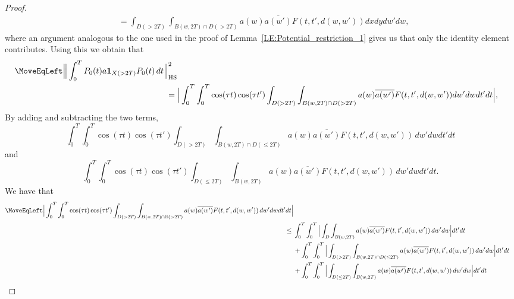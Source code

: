 \documentclass[11pt,twoside,reqno]{amsart}
\newcommand{\bH}{\mathbb{H}}
\newcommand{\1}{\mathrm{\mathbf{1}}}
\newcommand{\bHS}{\mathrm{HS}}
\numberwithin{equation}{section}
\theoremstyle{plain}
\theoremstyle{definition}
\theoremstyle{remark}
\begin{document}
\begin{proof}
\begin{equation*}
\begin{aligned}
         &=\int_{D( > 2T)}  \int_{B(w,2T)\cap D( > 2T) }  a(w) \overline{a(w')}  F(t,t',d(w, w')) dx dyd w' d w, 
    \end{aligned}
\end{equation*}
where an argument analogous to the one used in the proof of Lemma~\ref{LE:Potential_restriction_1} gives us that only the identity element contributes. Using this we obtain that 
\begin{equation}\label{EQ:free_HS_est_exponential_mixing_1}
    \begin{aligned}
         \MoveEqLeft \Big\lVert \int_0^T  P_0(t) a \boldsymbol{1}_{X( > 2T)} P_0(t) \,d t  \Big\rVert_{\bHS}^2 
         \\
         ={}&\Big| \int_0^T\int_0^T \cos(\tau t) \cos(\tau t') \int_{D( > 2T)}  \int_{B(w,2T)\cap D( > 2T) }  a(w) \overline{a(w')}  F(t,t',d(w,w'))d w' d w      d t'd t\Big|,
    \end{aligned}
\end{equation}
By adding and subtracting the two terms, 
\begin{equation*}
     \int_0^T\int_0^T \cos(\tau t) \cos(\tau t') \int_{D( > 2T)}  \int_{B(w,2T)\cap D( \leq 2T) } a(w) \overline{a(w')} F(t,t',d(w,w'))  \,d w' d w      d t'd t
\end{equation*}
and
\begin{equation*}
     \int_0^T\int_0^T \cos(\tau t) \cos(\tau t') \int_{D( \leq 2T)}  \int_{B(w,2T)} a(w) \overline{a(w')}  F(t,t',d(w,w')) \,d w' d w      d t'd t.
\end{equation*}
We have that
\begin{equation}\label{EQ:free_HS_est_exponential_mixing_3}
    \begin{aligned}
         \MoveEqLeft \Big| \int_0^T\int_0^T \cos(\tau t) \cos(\tau t') \int_{D( > 2T)}  \int_{B(w,2T)\cap \bH( > 2T) } a(w) \overline{a(w')} F(t,t',d(w,w'))  \,d w' d w      d t'd t\Big|
         \\
         \leq {}&  \int_0^T\int_0^T \Big| \int_{D}  \int_{B(w,2T) } a(w) \overline{a(w')}  F(t,t',d(w,w')) \,d w' d w   \Big|   d t'd t
         \\
         &+ \int_0^T\int_0^T \Big| \int_{D( > 2T)}  \int_{B(w,2T)\cap D( \leq 2T) } a(w) \overline{a(w')} F(t,t',d(w,w'))  \,d w' d w    \Big|  d t'd t 
         \\
         &+ \int_0^T\int_0^T \Big| \int_{D( \leq 2T)}  \int_{B(w,2T)} a(w) \overline{a(w')}  F(t,t',d(w,w'))  \,d w' d w  \Big|    d t'd t 
         \\

\end{aligned}
\end{equation}
\end{proof}
\end{document}
